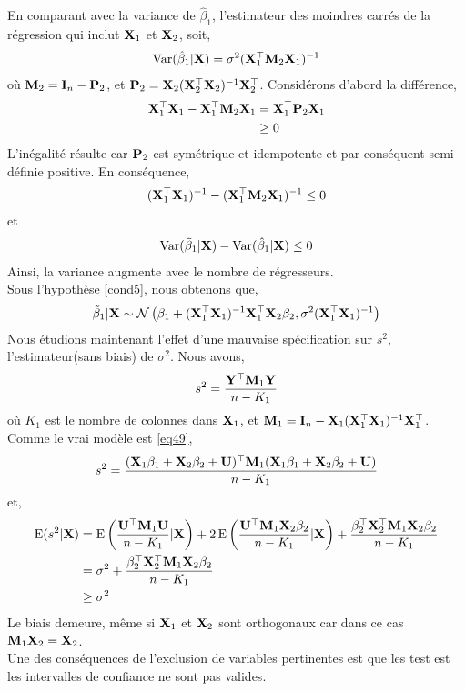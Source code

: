 En comparant avec la variance de $\hat{\beta}_1$, l'estimateur des moindres carrés de la régression qui inclut $\mathbf X_1$ et $\mathbf X_2$, soit,
\begin{align*}
\operatorname{Var}(\hat{\beta}_1|\mathbf X) = \sigma^2(\mathbf X_1^\top\mathbf M_2\mathbf X_1)^{-1}
\end{align*}
où $\mathbf M_2 = \mathbf{I}_n - \mathbf P_2$, et $ \mathbf P_2 = \mathbf X_2(\mathbf X_2^\top\mathbf X_2)^{-1}\mathbf X_2^\top$. Considérons d'abord la différence,
\begin{align*}
\mathbf X_1^\top\mathbf X_1-\mathbf X_1^\top\mathbf M_2\mathbf X_1 &= \mathbf X_1^\top\mathbf P_2\mathbf X_1\\
&\geq 0
\end{align*}
L'inégalité résulte car $\mathbf P_2$ est symétrique et idempotente et par conséquent semi-définie positive. En conséquence,
\begin{align*}
(\mathbf X_1^\top\mathbf X_1)^{-1} - (\mathbf X_1^\top\mathbf M_2\mathbf X_1)^{-1} \leq 0
\end{align*}
et
\begin{align*}
\operatorname{Var}(\tilde{\beta}_1|\mathbf X) - \operatorname{Var}(\hat{\beta}_1|\mathbf X) \leq 0
\end{align*}
Ainsi, la variance augmente avec le nombre de régresseurs.\\
Sous l'hypothèse \ref{cond5}, nous obtenons que,
\begin{align*}
\tilde{\beta}_1 | \mathbf X \sim \mathcal{N}\left(\beta_1 + (\mathbf X_1^\top\mathbf X_1)^{-1}\mathbf X_1^\top\mathbf X_2\beta_2, \sigma^2(\mathbf X_1^\top\mathbf X_1)^{-1}\right)
\end{align*}
Nous étudions maintenant l'effet d'une mauvaise spécification sur $s^2$, l'estimateur(sans biais) de $\sigma^2$. Nous avons,
\begin{align*}
s^2 = \frac{\mathbf Y^\top\mathbf M_1\mathbf Y}{n-K_1}
\end{align*}
où $K_1$ est le nombre de colonnes dans $\mathbf X_1$, et $\mathbf M_1 = \mathbf{I}_n - \mathbf X_1(\mathbf X_1^\top\mathbf X_1)^{-1}\mathbf X_1^\top$. Comme le vrai modèle est \eqref{eq49},
\begin{align*}
s^2 = \frac{(\mathbf X_1\beta_1 + \mathbf X_2\beta_2 + \mathbf U)^\top\mathbf M_1(\mathbf X_1\beta_1 + \mathbf X_2\beta_2 + \mathbf U)}{n-K_1}
\end{align*}
et,
\begin{align*}
\operatorname{E}(s^2|\mathbf X) &=\operatorname{E}\left(\frac{\mathbf U^\top\mathbf M_1\mathbf U}{n-K_1}|\mathbf X\right) + 2\operatorname{E}\left(\frac{\mathbf U^\top\mathbf M_1\mathbf X_2\beta_2}{n-K_1}| \mathbf X\right) +
\frac{\beta_2^\top\mathbf X_2^\top\mathbf M_1\mathbf X_2\beta_2}{n-K_1}\\
&=\sigma^2 + \frac{\beta_2^\top\mathbf X_2^\top\mathbf M_1\mathbf X_2\beta_2}{n-K_1}\\
&\geq \sigma^2
\end{align*}
Le biais demeure, même si $\mathbf X_1$ et $\mathbf X_2$ sont orthogonaux car dans ce cas $\mathbf M_1\mathbf X_2 = \mathbf X_2$. \\
Une des conséquences de l'exclusion de variables pertinentes est que les test est les intervalles de confiance ne sont pas valides.

